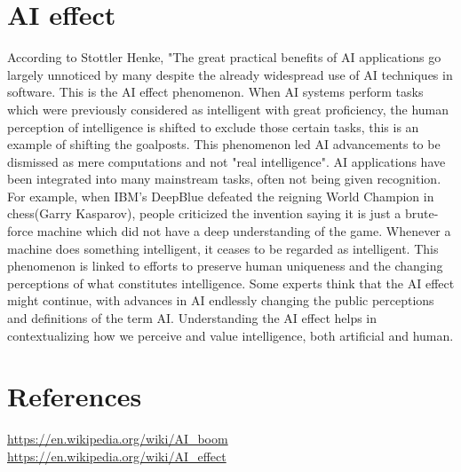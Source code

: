 \documentclass[final]{article}
\begin{document}
\section{AI effect}
According to Stottler Henke, "The great practical benefits of AI applications go largely unnoticed by many despite the already widespread use of AI techniques in software. This is the AI effect phenomenon. When AI systems perform tasks which were previously considered as intelligent with great proficiency, the human perception of intelligence is shifted to exclude those certain tasks, this is an example of shifting the goalposts. This phenomenon led AI advancements to be dismissed as mere computations and not "real intelligence". AI applications have been integrated into many mainstream tasks, often not being given recognition. For example, when IBM's DeepBlue defeated the reigning World Champion in chess(Garry Kasparov), people criticized the invention saying it is just a brute-force machine which did not have a deep understanding of the game. Whenever a machine does something intelligent, it ceases to be regarded as intelligent. This phenomenon is linked to efforts to preserve human uniqueness and the changing perceptions of what constitutes intelligence. Some experts think that the AI effect might continue, with advances in AI endlessly changing the public perceptions and definitions of the term AI. Understanding the AI effect helps in contextualizing how we perceive and value intelligence, both artificial and human. 
\section{References}
\url{https://en.wikipedia.org/wiki/AI_boom} \\
\url{https://en.wikipedia.org/wiki/AI_effect}
\end{document}
